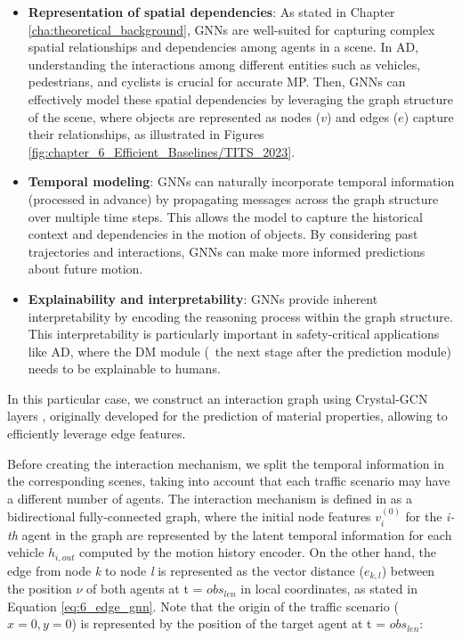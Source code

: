 \begin{itemize}
	\item \textbf{Representation of spatial dependencies}: As stated in Chapter \ref{cha:theoretical_background}, \acp{GNN} are well-suited for capturing complex spatial relationships and dependencies among agents in a scene. In \ac{AD}, understanding the interactions among different entities such as vehicles, pedestrians, and cyclists is crucial for accurate \ac{MP}. Then, \acp{GNN} can effectively model these spatial dependencies by leveraging the graph structure of the scene, where objects are represented as nodes ($v$) and edges ($e$) capture their relationships, as illustrated in Figures \ref{fig:chapter_6_Efficient_Baselines/TITS_2023}.
	
	\item \textbf{Temporal modeling}: \acp{GNN} can naturally incorporate temporal information (processed in advance) by propagating messages across the graph structure over multiple time steps. This allows the model to capture the historical context and dependencies in the motion of objects. By considering past trajectories and interactions, \acp{GNN} can make more informed predictions about future motion.
	
	\item \textbf{Explainability and interpretability}: \acp{GNN} provide inherent interpretability by encoding the reasoning process within the graph structure. This interpretability is particularly important in safety-critical applications like \ac{AD}, where the \ac{DM} module (\ie \ the next stage after the prediction module) needs to be explainable to humans.
	
\end{itemize}

In this particular case, we construct an interaction graph using Crystal-\ac{GCN} layers \cite{xie2018crystal, schmidt2022crat}, originally developed for the prediction of material properties, allowing to efficiently leverage edge features. 

Before creating the interaction mechanism, we split the temporal information in the corresponding scenes, taking into account that each traffic scenario may have a different number of agents. The interaction mechanism is defined in \cite{schmidt2022crat} as a bidirectional fully-connected graph, where the initial node features $v_i^{(0)}$ for the \textit{i-th} agent in the graph are represented by the latent temporal information for each vehicle $h_{i,out}$ computed by the motion history encoder. On the other hand, the edge from node \textit{k} to node \textit{l} is represented as the vector distance ($e_{k,l}$) between the position $\nu$ of both agents at t = \textit{$obs_{len}$} in local coordinates, as stated in Equation \ref{eq:6_edge_gnn}. Note that the origin of the traffic scenario ($x=0,y=0$) is represented by the position of the target agent at t = \textit{$obs_{len}$}:

